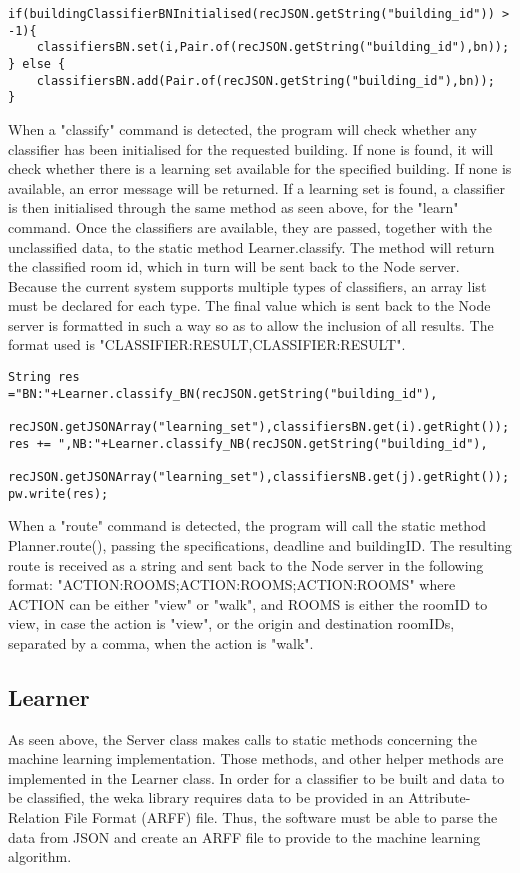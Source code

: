\begin{lstlisting}
if(buildingClassifierBNInitialised(recJSON.getString("building_id")) > -1){
	classifiersBN.set(i,Pair.of(recJSON.getString("building_id"),bn));
} else {
	classifiersBN.add(Pair.of(recJSON.getString("building_id"),bn));
}
\end{lstlisting}

When a "classify" command is detected, the program will check whether any classifier has been initialised for the requested building. If none is found, it will check whether there is a learning set available for the specified building. If none is available, an error message will be returned. If a learning set is found, a classifier is then initialised through the same method as seen above, for the "learn" command. Once the classifiers are available, they are passed, together with the unclassified data, to the static method Learner.classify. The method will return the classified room id, which in turn will be sent back to the Node server. Because the current system supports multiple types of classifiers, an array list must be declared for each type. The final value which is sent back to the Node server is formatted in such a way so as to allow the inclusion of all results. The format used is "CLASSIFIER:RESULT,CLASSIFIER:RESULT".
\begin{lstlisting}
String res ="BN:"+Learner.classify_BN(recJSON.getString("building_id"),
                  	recJSON.getJSONArray("learning_set"),classifiersBN.get(i).getRight());
res += ",NB:"+Learner.classify_NB(recJSON.getString("building_id"),
              	recJSON.getJSONArray("learning_set"),classifiersNB.get(j).getRight());
pw.write(res);
\end{lstlisting} 

When a "route" command is detected, the program will call the static method Planner.route(), passing the specifications, deadline and buildingID. The resulting route is received as a string and sent back to the Node server in the following format: "ACTION:ROOMS;ACTION:ROOMS;ACTION:ROOMS" where ACTION can be either "view" or "walk", and ROOMS is either the roomID to view, in case the action is "view", or the origin and destination roomIDs, separated by a comma, when the action is "walk".

\subsection{Learner}
As seen above, the Server class makes calls to static methods concerning the machine learning implementation. Those methods, and other helper methods are implemented in the Learner class. In order for a classifier to be built and data to be classified, the weka library requires data to be provided in an Attribute-Relation File Format (ARFF) file. Thus, the software must be able to parse the data from JSON and create an ARFF file to provide to the machine learning algorithm.

